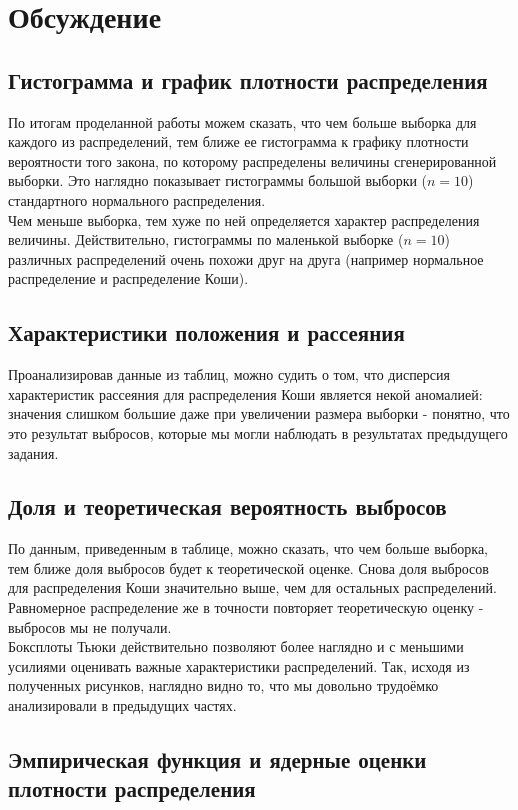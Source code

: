 \section{Обсуждение}

\subsection{Гистограмма и график плотности распределения}
По итогам проделанной работы можем сказать, что чем больше выборка для каждого из распределений, тем ближе ее гистограмма к графику плотности вероятности того закона, по которому распределены величины сгенерированной выборки. Это наглядно показывает гистограммы большой выборки ($n=10$) стандартного нормального распределения. \\
Чем меньше выборка, тем хуже по ней определяется характер распределения величины. Действительно, гистограммы по маленькой выборке ($n=10$) различных распределений очень похожи друг на друга (например нормальное распределение и распределение Коши).

\subsection{Характеристики положения и рассеяния}

Проанализировав данные из таблиц, можно судить о том, что дисперсия характеристик рассеяния для распределения Коши является некой аномалией: значения слишком большие даже при увеличении размера выборки - понятно, что это результат выбросов, которые мы могли наблюдать в результатах предыдущего задания.

\subsection{Доля и теоретическая вероятность выбросов}

По данным, приведенным в таблице, можно сказать, что чем больше выборка, тем ближе доля выбросов будет к теоретической оценке. Снова доля
выбросов для распределения Коши значительно выше, чем для остальных распределений. Равномерное распределение же в точности повторяет теоретическую оценку - выбросов мы не получали. \\
Боксплоты Тьюки действительно позволяют более наглядно и с меньшими усилиями оценивать важные характеристики распределений. Так, исходя из полученных рисунков, наглядно видно то, что мы довольно трудоёмко анализировали в предыдущих частях. 

\subsection{Эмпирическая функция и ядерные оценки плотности распределения}

